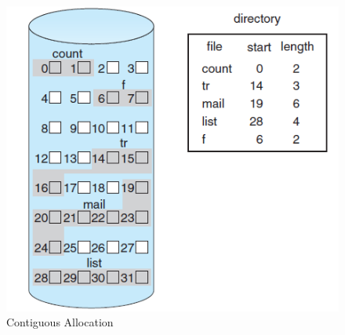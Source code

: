 \documentclass{article}
\theoremstyle{plain}
\theoremstyle{definition}
\begin{document}
\begin{figure}
    \centering
    \includegraphics[scale=0.6]{os8.png}
    \caption{Contiguous Allocation}
    \label{fig:my_label_19}
\end{figure}
\end{document}

